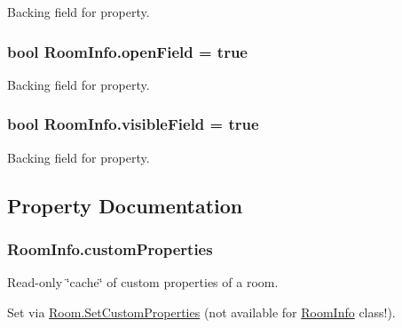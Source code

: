 Backing field for property.

\subsubsection[{\texorpdfstring{open\+Field}{openField}}]{\setlength{\rightskip}{0pt plus 5cm}bool Room\+Info.\+open\+Field = true\hspace{0.3cm}{\ttfamily [protected]}}\hypertarget{class_room_info_a6ee1a8dc240cfc8f983192806e751f14}{}\label{class_room_info_a6ee1a8dc240cfc8f983192806e751f14}


Backing field for property.

\subsubsection[{\texorpdfstring{visible\+Field}{visibleField}}]{\setlength{\rightskip}{0pt plus 5cm}bool Room\+Info.\+visible\+Field = true\hspace{0.3cm}{\ttfamily [protected]}}\hypertarget{class_room_info_a9fe8d4b4891f2d6e57dcd774048f2545}{}\label{class_room_info_a9fe8d4b4891f2d6e57dcd774048f2545}


Backing field for property.



\subsection{Property Documentation}
\subsubsection[{\texorpdfstring{custom\+Properties}{customProperties}}]{ Room\+Info.\+custom\+Properties\hspace{0.3cm}{\ttfamily [get]}}\hypertarget{class_room_info_a928b103a3e88d2c090152440aa6fa874}{}\label{class_room_info_a928b103a3e88d2c090152440aa6fa874}


Read-\/only \char`\"{}cache\char`\"{} of custom properties of a room. 

Set via \hyperlink{class_room_a9f8ac164f4f24be4140221b72792250a}{Room.\+Set\+Custom\+Properties} (not available for \hyperlink{class_room_info}{Room\+Info} class!).

